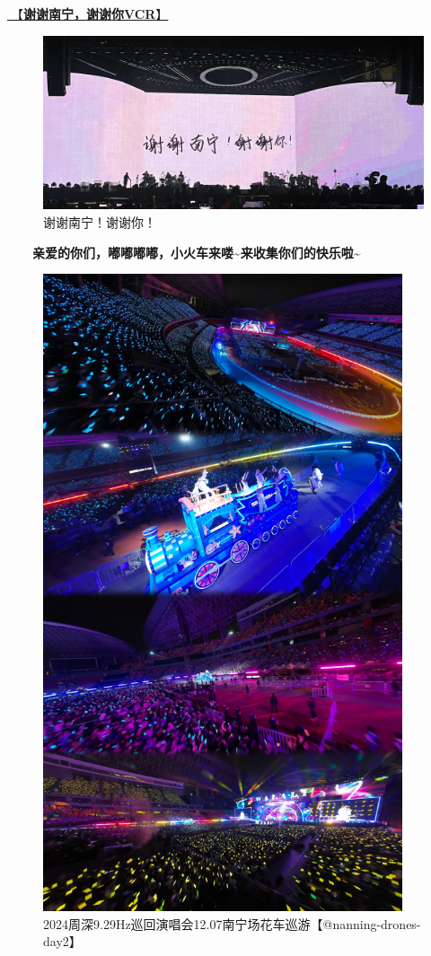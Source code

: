 \documentclass[]{ctexbook}
\begin{document}
\hyperref[thank-you-vcr]{🎥【\textbf{谢谢南宁，谢谢你VCR}】}

\begin{figure}

{\centering \includegraphics[width=400pt]{img/nanning20241207/thank-nanning} 

}

\caption{谢谢南宁！谢谢你！}\label{fig:unnamed-chunk-164}
\end{figure}

  \textbf{亲爱的你们，嘟嘟嘟嘟，小火车来喽\textasciitilde 来收集你们的快乐啦\textasciitilde{}}

\begin{figure}

{\centering \includegraphics[width=300pt]{img/nanning20241207/002} 

}

\caption{2024周深9.29Hz巡回演唱会12.07南宁场花车巡游【@nanning-drones-day2】}\label{fig:unnamed-chunk-165}
\end{figure}
\end{document}
